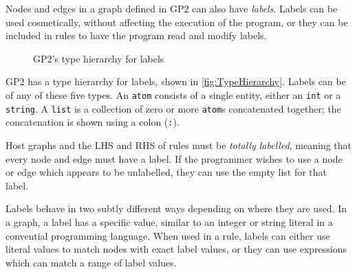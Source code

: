 \documentclass[authoryearcitations]{UoYCSproject}
\newenvironment{nscenter}
    {\parskip=0pt\par\nopagebreak\centering}
    {\par\noindent\ignorespacesafterend}
\begin{document}
Nodes and edges in a graph defined in GP2 can also have \emph{labels}. Labels
can be used cosmetically, without affecting the execution of the program, or
they can be included in rules to have the program read and modify labels.

\begin{figure}
    \begin{framed}
    \begin{nscenter}
    \end{nscenter}
    \end{framed}
    \caption{GP2's type hierarchy for labels}
    \label{fig:TypeHierarchy}
\end{figure}

GP2 has a type hierarchy for labels, shown in \autoref{fig:TypeHierarchy}. Labels
can be of any of these five types. An \texttt{atom} consists of a single entity,
either an \texttt{int} or a \texttt{string}. A \texttt{list} is a collection of
zero or more \texttt{atom}s concatenated together; the concatenation is shown using
a colon (\texttt{:}).

Host graphs and the LHS and RHS of rules must be \emph{totally labelled}, meaning
that every node and edge must have a label. If the programmer wishes to use a node
or edge which appears to be unlabelled, they can use the empty list for that label.

Labels behave in two subtly different ways depending on where they are used. In a
graph, a label has a specific value, similar to an integer or string literal in a
convential programming language. When used in a rule, labels can either use literal
values to match nodes with exact label values, or they can use expressions which
can match a range of label values.
\end{document}
